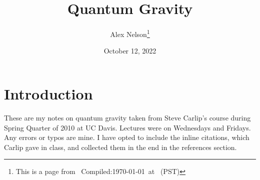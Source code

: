 \documentclass{article}
\title{Quantum Gravity}
\author{Alex Nelson\thanks{This is a page from \homeurl{}\hfil\break\indent\;\, Compiled:\enspace\today\ at \currenttime\ (PST)}}
\date{October 12, 2022}
\begin{document}
\maketitle

\section*{Introduction}
These are my notes on quantum gravity taken from Steve Carlip's course during Spring Quarter of 2010 at UC Davis. Lectures were on Wednesdays and Fridays.
Any errors or typos are mine. I have opted to include the inline citations, which Carlip gave in class, and collected them in the end in the references section.






\end{document}
